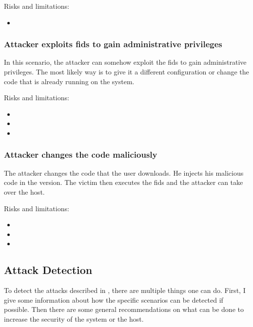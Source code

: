 Risks and limitations:
\begin{itemize}
	\item {}
\end{itemize}

\subsubsection{Attacker exploits \gls{fids} to gain administrative privileges}
\label{sec:attack:exploitforroot}

In this scenario, the attacker can somehow exploit the \gls{fids} to gain administrative privileges. The most likely way is to give it a different configuration or change the code that is already running on the system. 

Risks and limitations:
\begin{itemize}
	\item {}
	\item {}
	\item {}
\end{itemize}

\subsubsection{Attacker changes the code maliciously}
\label{sec:attack:codechange}

The attacker changes the code that the user downloads. He injects his malicious code in the version. The victim then executes the \gls{fids} and the attacker can take over the host.

Risks and limitations:
\begin{itemize}
	\item {}
	\item {}
	\item {}
\end{itemize}

\subsection{Attack Detection}
\label{sec:mittigations}

To detect the attacks described in , there are multiple things one can do. First, I give some information about how the specific scenarios can be detected if possible. Then there are some general recommendations on what can be done to increase the security of the system or the host.

